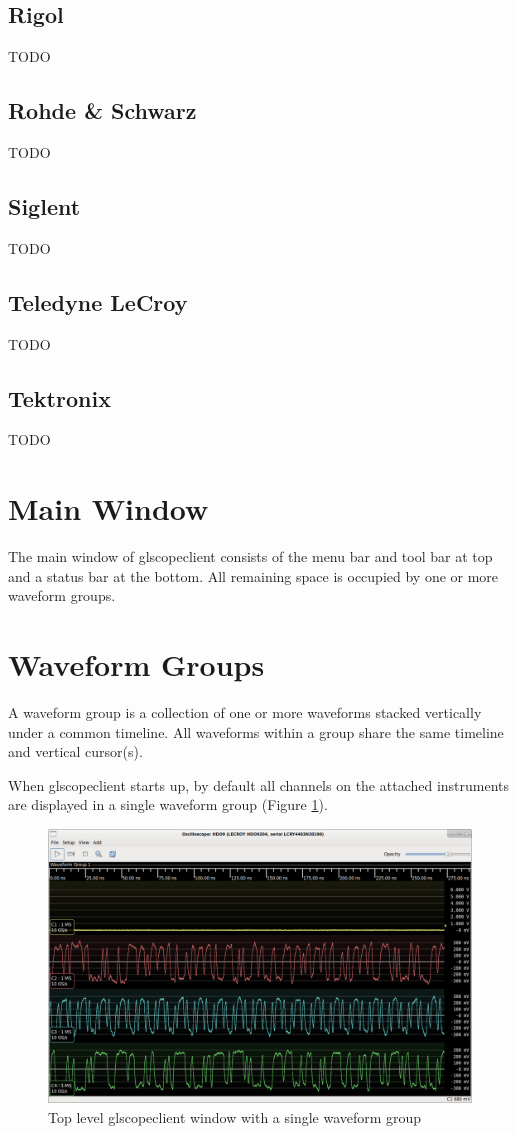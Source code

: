 \documentclass[11pt]{article}
\begin{document}
\subsection{Rigol}
TODO

\subsection{Rohde \& Schwarz}
TODO

\subsection{Siglent}
TODO

\subsection{Teledyne LeCroy}
TODO

\subsection{Tektronix}
TODO

\pagebreak
\section{Main Window}

The main window of glscopeclient consists of the menu bar and tool bar at top and a status bar at the bottom. All
remaining space is occupied by one or more waveform groups.

\section{Waveform Groups}

A waveform group is a collection of one or more waveforms stacked vertically under a common timeline. All waveforms
within a group share the same timeline and vertical cursor(s).

When glscopeclient starts up, by default all channels on the attached instruments are displayed in a single waveform
group (Figure \ref{single-group}).

\begin{figure}[h]
\centering
\includegraphics[width=13cm]{images/overview.png}
\caption{Top level glscopeclient window with a single waveform group}
\label{single-group}
\end{figure}
\end{document}
